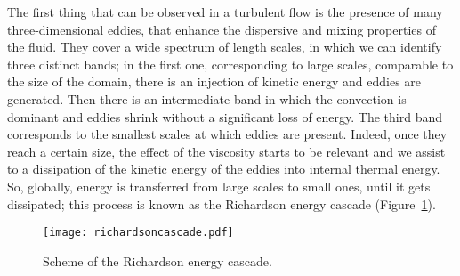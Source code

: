 The first thing that can be observed in a turbulent flow is the presence of 
many three-dimensional eddies, that enhance the dispersive and mixing 
properties 
of the fluid. 
They cover a wide spectrum of length scales, in which we can identify 
three distinct bands; in the first one, corresponding to large scales, 
comparable to the size of the domain, there is an injection of kinetic energy 
and eddies are generated. Then there is an intermediate band in which the 
convection is dominant and eddies shrink without a significant loss of energy. 
The third band corresponds to the smallest scales at which eddies are present. 
Indeed, once they reach a certain size, the effect of the viscosity starts to 
be relevant and we assist to a dissipation of the kinetic energy of the eddies 
into internal thermal energy. So, globally, energy is transferred from large 
scales to small ones, until it gets dissipated; this process is known as 
the Richardson energy cascade (Figure~\ref{fig:cascade}).
\begin{figure}%
	\centering
	\texttt{[image: richardsoncascade.pdf]}
	\caption[Richardson energy cascade]{Scheme of the Richardson energy 
	cascade.}
	\label{fig:cascade}
\end{figure}
%

